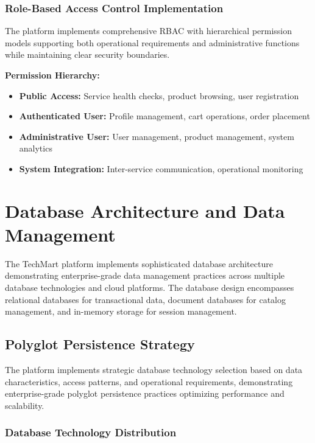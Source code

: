 \subsubsection{Role-Based Access Control Implementation}

The platform implements comprehensive RBAC with hierarchical permission models supporting both operational requirements and administrative functions while maintaining clear security boundaries.

\textbf{Permission Hierarchy:}
\begin{itemize}
\item \textbf{Public Access:} Service health checks, product browsing, user registration
\item \textbf{Authenticated User:} Profile management, cart operations, order placement
\item \textbf{Administrative User:} User management, product management, system analytics
\item \textbf{System Integration:} Inter-service communication, operational monitoring
\end{itemize}

\section{Database Architecture and Data Management}

The TechMart platform implements sophisticated database architecture demonstrating enterprise-grade data management practices across multiple database technologies and cloud platforms. The database design encompasses relational databases for transactional data, document databases for catalog management, and in-memory storage for session management.

\subsection{Polyglot Persistence Strategy}

The platform implements strategic database technology selection based on data characteristics, access patterns, and operational requirements, demonstrating enterprise-grade polyglot persistence practices optimizing performance and scalability.

\subsubsection{Database Technology Distribution}

